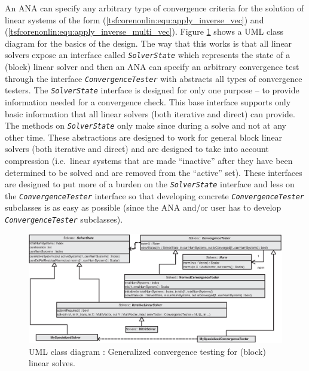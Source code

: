 An ANA can specify any arbitrary type of convergence criteria for the
solution of linear systems of the form
(\ref{tsfcorenonlin:equ:apply_inverse_vec}) and
(\ref{tsfcorenonlin:equ:apply_inverse_multi_vec}).  Figure
\ref{tsfcorenonlin:fig:ConvergenceTester} shows a UML class diagram for the basics
of the design.  The way that this works is that all linear solvers
expose an interface called
\texttt{\textit{Solver\-State}} which represents the state of a
(block) linear solver and then an ANA can specify an arbitrary
convergence test through the interface \texttt{\textit{ConvergenceTester}}
with abstracts all types of convergence testers.  The
\texttt{\textit{Solver\-State}} interface is designed for only one
purpose -- to provide information needed for a convergence check.
This base interface supports only basic information that all linear
solvers (both iterative and direct) can provide.  The methods on
\texttt{\textit{Solver\-State}} only make since during a solve and
not at any other time.  These abstractions are designed to work for
general block linear solvers (both iterative and direct) and are
designed to take into account compression (i.e.~linear systems that are
made ``inactive'' after they have been determined to be solved and are
removed from the ``active'' set).  These interfaces are designed to
put more of a burden on the
\texttt{\textit{Solver\-State}} interface and less on the
\texttt{\textit{ConvergenceTester}} interface so that developing concrete
\texttt{\textit{ConvergenceTester}} subclasses is as easy as possible
(since the ANA and/or user has to develop
\texttt{\textit{ConvergenceTester}} subclasses).

{\bsinglespace
\begin{figure}[t]
\begin{center}
\includegraphics*[bb= 0.0in 0.0in 8.55in 3.6in,angle=0,scale=0.70
]{TSFCoreSolvers}
\end{center}
\caption{
\label{tsfcorenonlin:fig:ConvergenceTester}
UML class diagram : Generalized convergence testing for (block) linear solves.
}
\end{figure}
\esinglespace}


